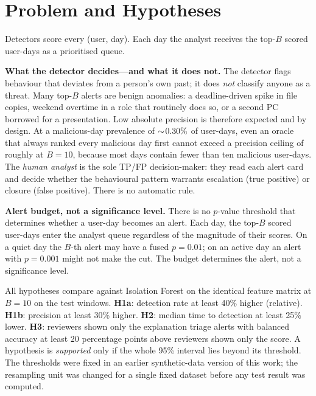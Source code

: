 \documentclass[conference]{IEEEtran}
\newcommand{\B}{\ensuremath{B}}
\begin{document}
\section{Problem and Hypotheses}
Detectors score every (user, day). Each day the analyst receives the top-\B{} scored user-days as a
prioritised queue.

\textbf{What the detector decides---and what it does not.}
The detector flags behaviour that deviates from a person's own past; it does \emph{not} classify
anyone as a threat. Many top-$B$ alerts are benign anomalies: a deadline-driven spike in file
copies, weekend overtime in a role that routinely does so, or a second PC borrowed for a
presentation. Low absolute precision is therefore expected and by design. At a malicious-day
prevalence of $\sim\!0.30\%$ of user-days, even an oracle that always ranked every
malicious day first cannot exceed a precision ceiling of roughly \OracleP{} at $B=10$, because
most days contain fewer than ten malicious user-days. The \emph{human analyst} is the sole
TP/FP decision-maker: they read each alert card and decide whether the behavioural pattern
warrants escalation (true positive) or closure (false positive). There is no automatic rule.

\textbf{Alert budget, not a significance level.}
There is no $p$-value threshold that determines whether a user-day becomes an alert. Each day,
the top-$B$ scored user-days enter the analyst queue regardless of the magnitude of their scores.
On a quiet day the $B$-th alert may have a fused $p=0.01$; on an active day an alert with
$p=0.001$ might not make the cut. The budget determines the alert, not a significance level.

All hypotheses compare against Isolation Forest on the identical feature matrix at $\B=10$ on the
test windows. \textbf{H1a}: detection rate at least 40\% higher (relative). \textbf{H1b}:
precision at least 30\% higher. \textbf{H2}: median time to detection at least 25\% lower.
\textbf{H3}: reviewers shown only the explanation triage alerts with balanced accuracy at least 20
percentage points above reviewers shown only the score. A hypothesis is \emph{supported} only if
the whole 95\% interval lies beyond its threshold. The thresholds were fixed in an earlier
synthetic-data version of this work; the resampling unit was changed for a single fixed dataset
before any test result was computed.

\end{document}
